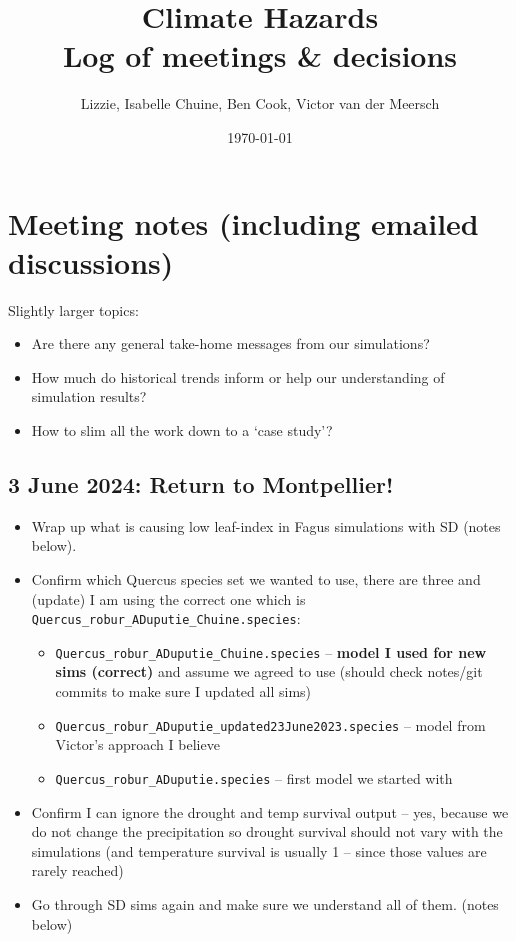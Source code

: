 \documentclass[11pt,letter]{article}
\begin{document}

\renewcommand{\refname}{\CHead{}}

\title{Climate Hazards \\ Log of meetings \& decisions}
\author{Lizzie, Isabelle Chuine, Ben Cook, Victor van der Meersch}
\date{\today}
\maketitle
\tableofcontents

\setlength{\parindent}{0pt}
\setlength{\parskip}{3pt}

\section{Meeting notes (including emailed discussions)}

Slightly larger topics: 
\begin{itemize}
\item Are there any general take-home messages from our simulations?
\item How much do historical trends inform or help our understanding of simulation results?
\item How to slim all the work down to a `case study'? 
\end{itemize}

\subsection{3 June 2024: Return to Montpellier!}

\begin{itemize}
\item Wrap up what is causing low leaf-index in Fagus simulations with SD (notes below).
\item Confirm which Quercus species set we wanted to use, there are three and (update) I am using the correct one which is \verb|Quercus_robur_ADuputie_Chuine.species|:
\begin{itemize}
\item \verb|Quercus_robur_ADuputie_Chuine.species| -- {\bf model I used for new sims (correct)} and assume we agreed to use (should check notes/git commits to make sure I updated all sims)
\item \verb|Quercus_robur_ADuputie_updated23June2023.species| -- model from Victor's approach I believe
\item \verb|Quercus_robur_ADuputie.species| -- first model we started with
\end{itemize}
\item Confirm I can ignore the drought and temp survival output -- yes, because we do not change the precipitation so drought survival should not vary with the simulations (and temperature survival is usually 1 -- since those values are rarely reached)
\item Go through SD sims again and make sure we understand all of them. (notes below)
\end{itemize}
\end{document}
